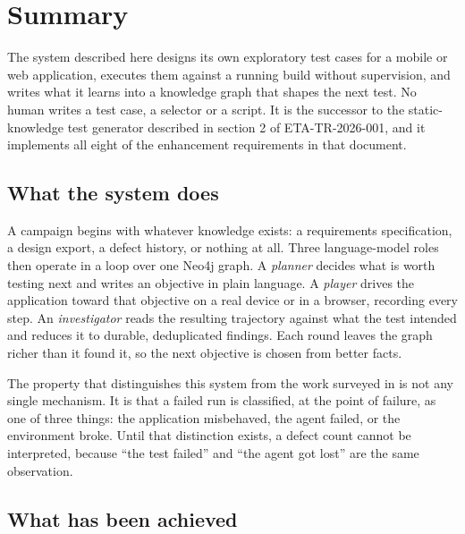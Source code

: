 \section{Summary}
\label{sec:summary}

The system described here designs its own exploratory test cases for a mobile
or web application, executes them against a running build without supervision,
and writes what it learns into a knowledge graph that shapes the next test. No
human writes a test case, a selector or a script. It is the
successor to the static-knowledge test generator described in section 2 of
ETA-TR-2026-001, and it implements all eight of the enhancement requirements in
that document.

\subsection*{What the system does}

A campaign begins with whatever knowledge exists: a requirements
specification, a design export, a defect history, or nothing at all. Three
language-model roles then operate in a loop over one Neo4j graph. A
\emph{planner} decides what is worth testing next and writes an objective in
plain language. A \emph{player} drives the application toward that objective on
a real device or in a browser, recording every step. An \emph{investigator}
reads the resulting trajectory against what the test intended and reduces it to
durable, deduplicated findings. Each round leaves the graph richer than it found
it, so the next objective is chosen from better facts.

The property that distinguishes this system from the work surveyed in
 is not any single mechanism. It is that a failed run is
classified, at the point of failure, as one of three things: the application
misbehaved, the agent failed, or the environment broke. Until that distinction
exists, a defect count cannot be interpreted, because ``the test failed'' and
``the agent got lost'' are the same observation.

\subsection*{What has been achieved}

